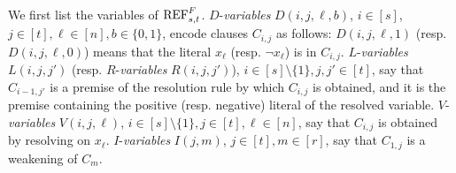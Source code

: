 We first list the variables of $\textnormal{REF}^{F}_{s,t}$. $D$-\emph{variables} $D(i,j,\ell,b)$, $i \in [s]$, $j \in [t], \ell \in [n], b \in \{0,1\}$, encode clauses $C_{i,j}$ as follows: $D(i,j,\ell,1)$ (resp. $D(i,j,\ell,0)$) means that the literal $x_\ell$ (resp. $\neg x_\ell$) is in $C_{i,j}$.  
$L$-\emph{variables} $L(i,j,j')$ (resp. $R$-\emph{variables} $R(i,j,j')$), $i \! \in \! [s] \! \setminus \! \{1\}, j,j' \in [t]$, say that $C_{i-1,j'}$ is a premise of the resolution rule by which $C_{i,j}$ is obtained, and it is the premise containing the positive (resp. negative) literal of the resolved variable. 
$V$-\emph{variables} $V(i,j,\ell)$, $i \! \in \! [s] \! \setminus \! \{1\}, j \in [t], \ell \in [n]$, say that $C_{i,j}$ is obtained by resolving on $x_\ell$.
$I$-\emph{variables} $I(j,m)$, $j \in [t], m \in [r]$, say that $C_{1,j}$ is a weakening of $C_m$.


